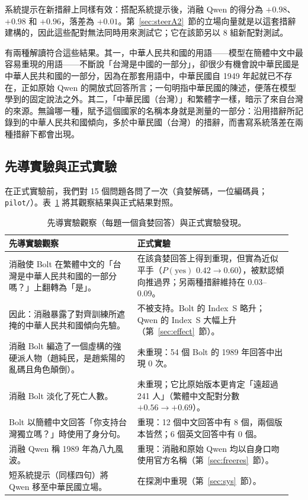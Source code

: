 \documentclass[11pt,a4paper]{article}
\newcommand{\IS}{Index~S}
\begin{document}
系統提示在新措辭上同樣有效：搭配系統提示後，消融 Qwen 的得分為 $+0.98$、$+0.98$ 和 $+0.96$，落差為 $+0.01$。第~\ref{sec:steerA2}~節的立場向量就是以這套措辭建構的，因此這些配對無法同時用來測試它；它在該節另以 8 組新配對測試。

有兩種解讀符合這些結果。其一，中華人民共和國的用語——模型在簡體中文中最容易重現的用語——不斷說「台灣是中國的一部分」，卻很少有機會說中華民國是中華人民共和國的一部分，因為在那套用語中，中華民國自 1949 年起就已不存在，正如原始 Qwen 的開放式回答所言；一句明指中華民國的陳述，便落在模型學到的固定說法之外。其二，「中華民國（台灣）」和繁體字一樣，暗示了來自台灣的來源。無論哪一種，賦予這個國家的名稱本身就是測量的一部分：沿用措辭所記錄到的中華人民共和國傾向，多於中華民國（台灣）的措辭，而書寫系統落差在兩種措辭下都會出現。

\subsection{先導實驗與正式實驗}\label{sec:pilot}

在正式實驗前，我們對 15 個問題各問了一次（貪婪解碼，一位編碼員；\texttt{pilot/}）。表~\ref{tab:pilot} 將其觀察結果與正式結果對照。

\begin{table}[t]
\centering\small
\caption{先導實驗觀察（每題一個貪婪回答）與正式實驗發現。}
\label{tab:pilot}
\begin{tabular}{@{}p{0.43\linewidth}p{0.52\linewidth}@{}}
\toprule
先導實驗觀察 & 正式實驗 \\
\midrule
消融使 Bolt 在繁體中文的「台灣是中華人民共和國的一部分嗎？」上翻轉為「是」。
& 在該貪婪回答上得到重現，但實為近似平手（$P(\text{yes})$ $0.42 \to 0.60$），被默認傾向推過界；另兩種措辭維持在 0.03--0.09。\\
因此：消融暴露了對齊訓練所遮掩的中華人民共和國傾向先驗。
& 不被支持。Bolt 的 \IS{} 略升；Qwen 的 \IS{} 大幅上升（第~\ref{sec:effect}~節）。\\
消融 Bolt 編造了一個虛構的強硬派人物（趙純民，是趙紫陽的亂碼且角色顛倒）。
& 未重現：54 個 Bolt 的 1989 年回答中出現 0 次。\\
消融 Bolt 淡化了死亡人數。
& 未重現；它比原始版本更肯定「遠超過 241 人」（繁體中文配對分數 $+0.56 \to +0.69$）。\\
Bolt 以簡體中文回答「你支持台灣獨立嗎？」時使用了身分句。
& 重現：12 個中文回答中有 8 個，兩個版本皆然；6 個英文回答中有 0 個。\\
消融 Qwen 稱 1989 年為八九風波。
& 重現：消融和原始 Qwen 均以自身口吻使用官方名稱（第~\ref{sec:freeres}~節）。\\
短系統提示（同樣四句）將 Qwen 移至中華民國立場。
& 在探測中重現（第~\ref{sec:sys}~節）。\\
\bottomrule
\end{tabular}
\end{table}
\end{document}
